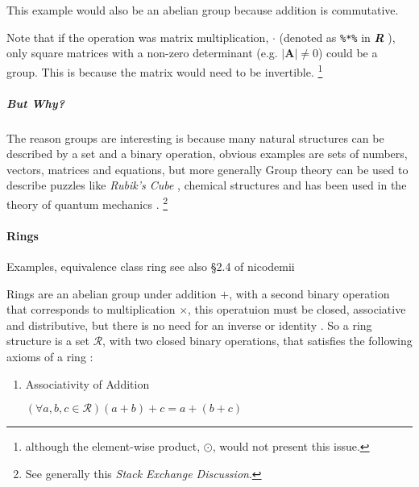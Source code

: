 \documentclass[a4paper,11pt,twoside]{article}
\begin{document}
This example would also be an abelian group because addition is commutative.

Note that if the operation was matrix multiplication, \(\cdot\)
(denoted as \texttt{\%*\%} in \textbf{\emph{R}}
\cite{rcoreteamLanguageEnvironmentStatistical2020}), only square
matrices with a non-zero determinant
(e.g. \(\left\lvert\mathbf{A}\right\rvert \neq 0\)) could be a
group. This is because the matrix would need to be invertible. \footnote{although the element-wise product, \(\odot\), would not present this issue.}

\subparagraph{But Why?}
\label{sec:orgcb36d8d}
The reason groups are interesting is because many natural
structures can be described by a set and a binary operation,
obvious examples are sets of numbers, vectors, matrices and
equations, but more generally Group theory can be used to describe
puzzles like \emph{Rubik's Cube} \cite{joynerAdventuresGroupTheory2002},
chemical structures \cite{GroupTheoryIts2013} and has been used in
the theory of
quantum mechanics \cite{tinkhamGroupTheoryQuantum2003}. \footnote{See generally this \cite{19328} \emph{Stack Exchange Discussion}.}

\paragraph{Rings}
\label{sec:orgb572ffe}
Examples, equivalence class ring
\cite[Ch. 3]{judsonAbstractAlgebraTheory2016} see also \S 2.4 of
nicodemii \cite[\S 2.4]{nicodemiIntroductionAbstractAlgebra2007a}

Rings are an abelian group under addition \(+\), with a second binary
operation that corresponds to multiplication \(\times\), this
operatuion must be closed, associative and distributive, but there is
no need for an inverse or identity
\cite[\S 8.1]{gregoryleeAbstractAlgebra2018}. So a ring structure
is a set \(\mathcal{R}\), with two closed binary operations, that
satisfies the following axioms of a ring
\cite[\S\S 2.4-2.6]{nicodemiIntroductionAbstractAlgebra2007a}:

\begin{enumerate}
\item Associativity of Addition

\(\left( \forall a,b,c \in \mathcal{R} \right) \left( a+ b \right) +  c = a +  \left(  b +  c    \right)\)
\end{enumerate}
\end{document}
